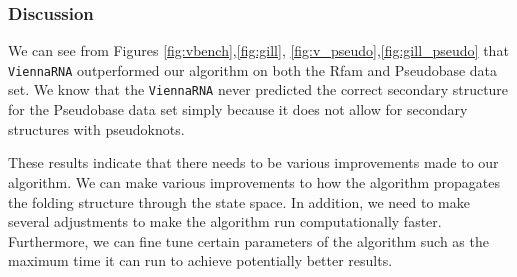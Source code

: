 \documentclass[11pt]{article}
\begin{document}
\begin{multicols}{2}
\subsubsection{Discussion}

We can see from Figures \ref{fig:vbench},\ref{fig:gill}, \ref{fig:v_pseudo},\ref{fig:gill_pseudo} that \texttt{ViennaRNA} outperformed our algorithm on both the Rfam and Pseudobase data set. We know that the \texttt{ViennaRNA} never predicted the correct secondary structure for the Pseudobase data set simply because it does not allow for secondary structures with pseudoknots. 

These results indicate that there needs to be various improvements made to our algorithm. We can make various improvements to how the algorithm propagates the folding structure through the state space. In addition, we need to make several adjustments to make the algorithm run computationally faster. Furthermore, we can fine tune certain parameters of the algorithm such as the maximum time it can run to achieve potentially better results.
\end{multicols}
\newpage 
\end{document}
